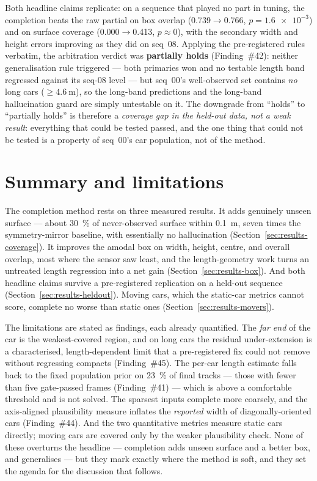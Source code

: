Both headline claims replicate: on a sequence that played no part in tuning, the
completion beats the raw partial on box overlap (\num{0.739}$\to$\num{0.766},
$p=\num{1.6e-3}$) and on surface coverage (\num{0.000}$\to$\num{0.413},
$p\approx0$), with the secondary width and height errors improving as they did on
seq~08. Applying the pre-registered rules verbatim, the arbitration verdict was
\textbf{partially holds} (Finding~\#42): neither generalisation rule triggered ---
both primaries won and no testable length band regressed against its seq-08 level
--- but seq~00's well-observed set contains \emph{no} long cars
(${\geq}\SI{4.6}{\meter}$), so the long-band predictions and the long-band
hallucination guard are simply untestable on it. The downgrade from ``holds'' to
``partially holds'' is therefore a \emph{coverage gap in the held-out data, not a
weak result}: everything that could be tested passed, and the one thing that could
not be tested is a property of seq~00's car population, not of the method.

\section{Summary and limitations}
\label{sec:results-summary}

The completion method rests on three measured results. It adds genuinely unseen
surface --- about \SI{30}{\percent} of never-observed surface within
\SI{0.1}{\meter}, seven times the symmetry-mirror baseline, with essentially no
hallucination (Section~\ref{sec:results-coverage}). It improves the amodal box on
width, height, centre, and overall overlap, most where the sensor saw least, and
the length-geometry work turns an untreated length regression into a net gain
(Section~\ref{sec:results-box}). And both headline claims survive a
pre-registered replication on a held-out sequence
(Section~\ref{sec:results-heldout}). Moving cars, which the static-car metrics
cannot score, complete no worse than static ones
(Section~\ref{sec:results-movers}).

The limitations are stated as findings, each already quantified. The
\emph{far end} of the car is the weakest-covered region, and on long cars the
residual under-extension is a characterised, length-dependent limit that a
pre-registered fix could not remove without regressing compacts (Finding~\#45).
The per-car length estimate falls back to the fixed population prior on
\SI{23}{\percent} of final tracks --- those with fewer than five gate-passed
frames (Finding~\#41) --- which is above a comfortable threshold and is not
solved. The sparsest inputs complete more coarsely, and the axis-aligned plausibility
measure inflates the \emph{reported} width of diagonally-oriented cars
(Finding~\#44). And the two quantitative metrics measure static cars directly;
moving cars are covered only by the weaker plausibility check. None of these
overturns the headline --- completion adds unseen surface and a better box, and
generalises --- but they mark exactly where the method is soft, and they set the
agenda for the discussion that follows.
